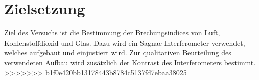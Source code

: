 \section{Zielsetzung}
\label{sec:zielsetzung}
Ziel des Versuchs ist die Bestimmung der Brechungsindices von Luft,
Kohlenstoffdioxid und Glas. Dazu wird ein Sagnac Interferometer verwendet,
welches aufgebaut und einjustiert wird. Zur qualitativen Beurteilung des
verwendeten Aufbau wird zusätzlich der Kontrast des Interferometers bestimmt.
>>>>>>> b1f0e420bb13178443b8784c5137fd7ebaa38025
